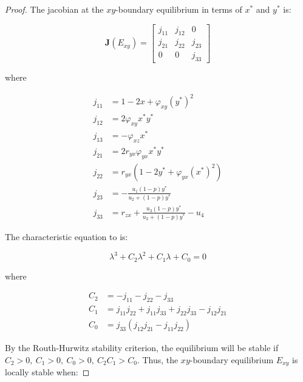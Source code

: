 \begin{proof}
    The jacobian at the $xy$-boundary equilibrium in terms of $x^*$ and $y^*$ is:

    \begin{equation}\label{matrix:jacobian-boundary-xy}
        \textbf{J}\left(E_{xy}\right) = \begin{bmatrix}
            j_{11} & j_{12} & 0\\
            j_{21} & j_{22} & j_{23}\\
            0 & 0 & j_{33}
        \end{bmatrix}
    \end{equation}

    where
    
    \begin{align*}
        j_{11} &= 1-2x+\varphi_{xy}\left(y^*\right)^2\\
        j_{12} &= 2\varphi_{xy}x^*y^*\\
        j_{13} &= -\varphi_{xz}x^*\\
        j_{21} &= 2r_{yx}\varphi_{yx}x^*y^*\\
        j_{22} &= r_{yx}\left(1-2y^*+\varphi_{yx}\left(x^*\right)^2\right)\\
        j_{23} &= -\frac{u_1\left(1-p\right)y^*}{u_2+\left(1-p\right)y^*}\\
        j_{33} &= r_{zx}+\frac{u_3\left(1-p\right)y^*}{u_2+\left(1-p\right)y^*}-u_4
    \end{align*}

    The characteristic equation to  is:

    \begin{equation*}\label{eq:char-eq-xy}
        \lambda^3+C_2\lambda^2+C_1\lambda+C_0=0
    \end{equation*}

    where
    
    \begin{align*}
        C_2 &= -j_{11}-j_{22}-j_{33}\\
        C_1 &= j_{11}j_{22}+j_{11}j_{33}+j_{22}j_{33}-j_{12}j_{21}\\
        C_0 &= j_{33}\left(j_{12}j_{21}-j_{11}j_{22}\right)
    \end{align*}

    By the Routh-Hurwitz stability criterion, the equilibrium will be stable if $C_2>0,\ C_1>0,\ C_0>0,\ C_2C_1>C_0$. Thus, the $xy$-boundary equilibrium $E_{xy}$ is locally stable when:


\end{proof}
